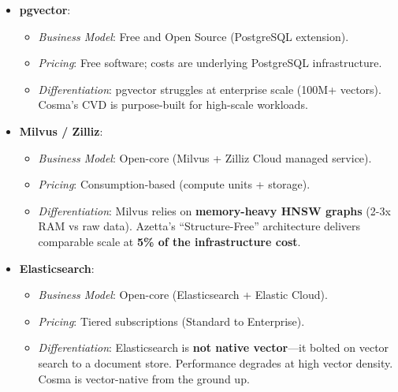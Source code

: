 \begin{itemize}
    \item \textbf{pgvector}:
    \begin{itemize}[noitemsep]
        \item \textit{Business Model}: Free and Open Source (PostgreSQL extension).
        \item \textit{Pricing}: Free software; costs are underlying PostgreSQL infrastructure.
        \item \textit{Differentiation}: pgvector struggles at enterprise scale (100M+ vectors). Cosma's CVD is purpose-built for high-scale workloads.
    \end{itemize}

    \item \textbf{Milvus / Zilliz}:
    \begin{itemize}[noitemsep]
        \item \textit{Business Model}: Open-core (Milvus + Zilliz Cloud managed service).
        \item \textit{Pricing}: Consumption-based (compute units + storage).
        \item \textit{Differentiation}: Milvus relies on \textbf{memory-heavy HNSW graphs} (2-3x RAM vs raw data). Azetta's ``Structure-Free'' architecture delivers comparable scale at \textbf{5\% of the infrastructure cost}.
    \end{itemize}

    \item \textbf{Elasticsearch}:
    \begin{itemize}[noitemsep]
        \item \textit{Business Model}: Open-core (Elasticsearch + Elastic Cloud).
        \item \textit{Pricing}: Tiered subscriptions (Standard to Enterprise).
        \item \textit{Differentiation}: Elasticsearch is \textbf{not native vector}—it bolted on vector search to a document store. Performance degrades at high vector density. Cosma is vector-native from the ground up.
    \end{itemize}
\end{itemize}

